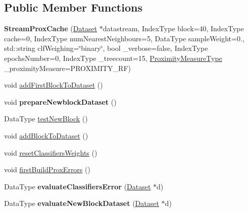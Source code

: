 \subsection*{Public Member Functions}
\begin{DoxyCompactItemize}
\item 
\hypertarget{classffactory_1_1_stream_prox_cache_aed430b8e348a710c1fd128d7ed4c59a9}{{\bfseries Stream\-Prox\-Cache} (\hyperlink{classffactory_1_1_dataset}{Dataset} $\ast$datastream, Index\-Type block=40, Index\-Type cache=0, Index\-Type num\-Nearest\-Neighbours=5, Data\-Type sample\-Weight=0., std\-::string clf\-Weighing=\char`\"{}binary\char`\"{}, bool \-\_\-verbose=false, Index\-Type epochs\-Number=0, Index\-Type \-\_\-treecount=15, \hyperlink{namespaceffactory_a4c245a9eacd4f260ee05929d46f1e3bb}{Proximity\-Measure\-Type} \-\_\-proximity\-Measure=P\-R\-O\-X\-I\-M\-I\-T\-Y\-\_\-\-R\-F)}\label{classffactory_1_1_stream_prox_cache_aed430b8e348a710c1fd128d7ed4c59a9}

\item 
void \hyperlink{classffactory_1_1_stream_prox_cache_ad1022eb9dcd9f6e47cfe9046d1916c1c}{add\-First\-Block\-To\-Dataset} ()
\item 
\hypertarget{classffactory_1_1_stream_prox_cache_ac17591412b9e1b901fafadaebbd23ad2}{void {\bfseries prepare\-Newblock\-Dataset} ()}\label{classffactory_1_1_stream_prox_cache_ac17591412b9e1b901fafadaebbd23ad2}

\item 
Data\-Type \hyperlink{classffactory_1_1_stream_prox_cache_a040dd6d7e781ef4350ffdb91498d6bdc}{test\-New\-Block} ()
\item 
void \hyperlink{classffactory_1_1_stream_prox_cache_a0156b6c88a88b8b25a10e9a5bcb606d2}{add\-Block\-To\-Dataset} ()
\item 
void \hyperlink{classffactory_1_1_stream_prox_cache_a1906dffe0b3da06fc4dd2f0c77950ac3}{reset\-Classifiers\-Weights} ()
\item 
void \hyperlink{classffactory_1_1_stream_prox_cache_a433df2e8aebb5e77ba64e5f32261500c}{first\-Build\-Prox\-Errors} ()
\item 
\hypertarget{classffactory_1_1_stream_prox_cache_ac77d09960d5a84cdf813f9a960413c0a}{Data\-Type {\bfseries evaluate\-Classifiers\-Error} (\hyperlink{classffactory_1_1_dataset}{Dataset} $\ast$d)}\label{classffactory_1_1_stream_prox_cache_ac77d09960d5a84cdf813f9a960413c0a}

\item 
\hypertarget{classffactory_1_1_stream_prox_cache_af194e47219e788235ed55dff640b8023}{Data\-Type {\bfseries evaluate\-New\-Block\-Dataset} (\hyperlink{classffactory_1_1_dataset}{Dataset} $\ast$d)}\label{classffactory_1_1_stream_prox_cache_af194e47219e788235ed55dff640b8023}


\end{DoxyCompactItemize}
